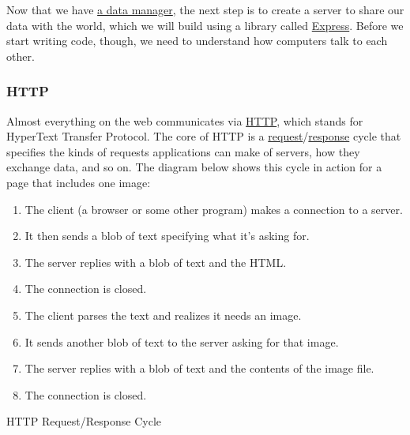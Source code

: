Now that we have \protect\hyperlink{s:dataman}{a data manager}, the next
step is to create a server to share our data with the world, which we
will build using a library called
\href{https://expressjs.org/}{Express}. Before we start writing code,
though, we need to understand how computers talk to each other.

\subsubsection{HTTP}\label{s:server-http}

Almost everything on the web communicates via
\protect\hyperlink{g:http}{HTTP}, which stands for HyperText Transfer
Protocol. The core of HTTP is a
\protect\hyperlink{g:http-request}{request}/\protect\hyperlink{g:http-response}{response}
cycle that specifies the kinds of requests applications can make of
servers, how they exchange data, and so on. The diagram below shows this
cycle in action for a page that includes one image:

\begin{enumerate}
\tightlist
\item
  The client (a browser or some other program) makes a connection to a
  server.
\item
  It then sends a blob of text specifying what it's asking for.
\item
  The server replies with a blob of text and the HTML.
\item
  The connection is closed.
\item
  The client parses the text and realizes it needs an image.
\item
  It sends another blob of text to the server asking for that image.
\item
  The server replies with a blob of text and the contents of the image
  file.
\item
  The connection is closed.
\end{enumerate}

HTTP Request/Response Cycle

